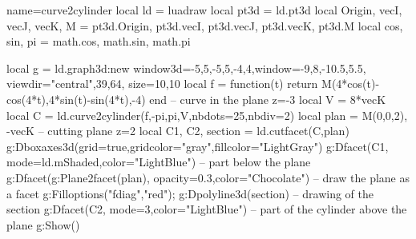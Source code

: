 \begin{luadraw}{name=curve2cylinder}
local ld = luadraw
local pt3d = ld.pt3d
local Origin, vecI, vecJ, vecK, M = pt3d.Origin, pt3d.vecI, pt3d.vecJ, pt3d.vecK, pt3d.M
local cos, sin, pi = math.cos, math.sin, math.pi

local g = ld.graph3d:new{ window3d={-5,5,-5,5,-4,4},window={-9,8,-10.5,5.5},
    viewdir={"central",39,64}, size={10,10}}
local f = function(t) return M(4*cos(t)-cos(4*t),4*sin(t)-sin(4*t),-4) end -- curve in the plane z=-3
local V = 8*vecK
local C = ld.curve2cylinder(f,-pi,pi,V,{nbdots=25,nbdiv=2})
local plan = {M(0,0,2), -vecK} -- cutting plane z=2
local C1, C2, section = ld.cutfacet(C,plan)
g:Dboxaxes3d({grid=true,gridcolor="gray",fillcolor="LightGray"})
g:Dfacet(C1, {mode=ld.mShaded,color="LightBlue"}) -- part below the plane
g:Dfacet(g:Plane2facet(plan), {opacity=0.3,color="Chocolate"}) -- draw the plane as a facet
g:Filloptions("fdiag","red"); g:Dpolyline3d(section) -- drawing of the section
g:Dfacet(C2, {mode=3,color="LightBlue"}) -- part of the cylinder above the plane
g:Show()
\end{luadraw}
